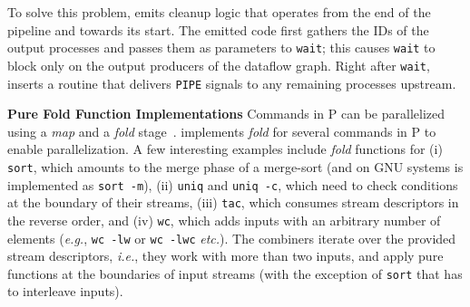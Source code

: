 \documentclass[letterpaper,twocolumn,10pt]{article}
\newcommand{\eg}{{\em e.g.}, }
\newcommand{\ie}{{\em i.e.}, }
\newcommand{\etc}{{\em etc.}\xspace}
\newcommand{\heading}[1]{\vspace{4pt}\noindent\textbf{#1}\enspace}
\newcommand{\ttt}[1]{\texttt{#1}}
\newcommand{\tcn}[1]{\mbox{\textcircled{\scriptsize #1}}}
\newcommand{\tpur}{\tcn{\textsc{P}}\xspace}
\newcommand{\todo}[1]{\hl{#1}\xspace}
\newcommand{\kk}[1]{[{\color{magenta}kk: #1}]}
\begin{document}
To solve this problem, \sys emits cleanup logic that operates from the
end of the pipeline and towards its start.  The emitted code first
gathers the IDs of the output processes and passes them as parameters
to \ttt{wait}; this causes \ttt{wait} to block only on the output
producers of the dataflow graph.  Right after \ttt{wait}, \sys inserts
a routine that delivers \ttt{PIPE} signals to any remaining processes
upstream.




\heading{Pure Fold Function Implementations}
Commands in \tpur can be parallelized using a \emph{map} and a \emph{fold} stage~.
\sys implements \emph{fold} for several commands in \tpur to enable parallelization.
A few interesting examples include \emph{fold} functions for
  (i) \ttt{sort}, which amounts to the merge phase of a merge-sort (and on GNU systems is implemented as \ttt{sort -m}),
  (ii) \ttt{uniq} and \ttt{uniq -c}, which need to check conditions at the boundary of their streams,
  (iii) \ttt{tac}, which consumes stream descriptors in the reverse order, and 
  (iv) \ttt{wc}, which adds inputs with an arbitrary number of elements (\eg \ttt{wc -lw} or \ttt{wc -lwc} \etc).
The combiners iterate over the provided stream descriptors, \ie they work with more than two inputs, and apply pure functions at the boundaries of input streams (with the exception of \ttt{sort} that has to interleave inputs).
\end{document}
